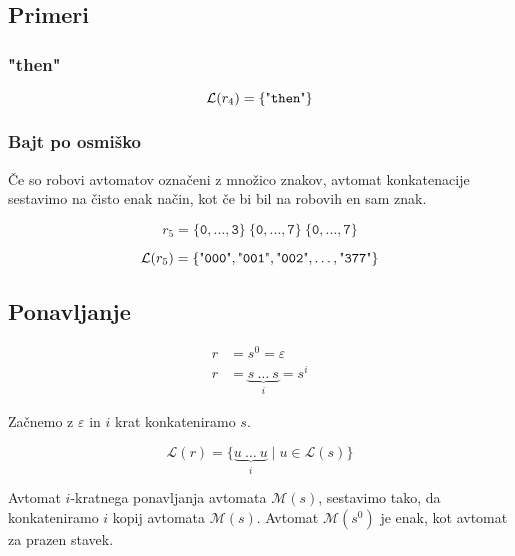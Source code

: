 \documentclass{article}
\newcommand{\Null}{\varepsilon}
\newcommand{\Language}[1]{\mathcal{L}(#1)}
\newcommand{\Automaton}[1]{\mathcal{M}(#1)}
\newcommand{\Str}[1]{\text{\textquotedbl\texttt{#1}\textquotedbl}}
\newcommand{\Char}[1]{\texttt{#1}}
\newcommand{\Seq}{\ }
\newcommand{\Rep}[2]{#1^#2}
\begin{document}
\subsection*{Primeri}

\subsubsection{"then"}
\begin{equation*}
  \Language{r_4} = \{ \Str{then} \}
\end{equation*}

\subsubsection{Bajt po osmiško}
Če so robovi avtomatov označeni z množico znakov, avtomat konkatenacije sestavimo na čisto enak način, kot če bi bil na robovih en sam znak.

\begin{equation*}
  r_5 = \{\Char{0}, \dots, \Char{3}\} \Seq \{\Char{0}, \dots, \Char{7}\} \Seq \{\Char{0}, \dots, \Char{7}\}
\end{equation*}

\begin{equation*}
  \Language{r_5} = \{ \Str{000}, \Str{001}, \Str{002}, \dots, \Str{377} \}
\end{equation*}

\subsection{Ponavljanje}

\begin{align*}
  r &= \Rep{s}{0} = \Null\\
  r &= \underbrace{s \Seq \ldots \Seq s}_{i} = \Rep{s}{i}
\end{align*}

Začnemo z $\Null$ in $i$ krat konkateniramo $s$.

\begin{equation*}
  \Language{r} = \{ \underbrace{u \Seq \ldots \Seq u}_{i} \mid u \in \Language{s}\}
\end{equation*}

Avtomat $i$-kratnega ponavljanja avtomata $\Automaton{s}$, sestavimo tako, da konkateniramo $i$ kopij avtomata $\Automaton{s}$.
Avtomat $\Automaton{s^0}$ je enak, kot avtomat za prazen stavek.
\end{document}
